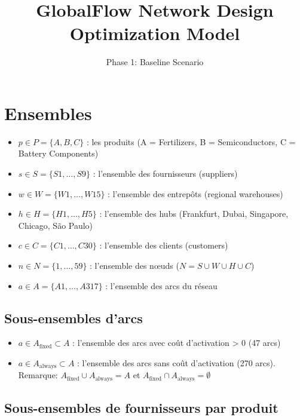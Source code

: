 \documentclass{article}
\begin{document}
\title{GlobalFlow Network Design Optimization Model}
\author{Phase 1: Baseline Scenario}
\date{}
\maketitle

\section{Ensembles}

\begin{itemize}
    \item $p \in P = \{A, B, C\}$ : les produits (A = Fertilizers, B = Semiconductors, C = Battery Components)
    \item $s \in S = \{S1, \dots, S9\}$ : l'ensemble des fournisseurs (suppliers)
    \item $w \in W = \{W1, \dots, W15\}$ : l'ensemble des entrepôts (regional warehouses)
    \item $h \in H = \{H1, \dots, H5\}$ : l'ensemble des hubs (Frankfurt, Dubai, Singapore, Chicago, São Paulo)
    \item $c \in C = \{C1, \dots, C30\}$ : l'ensemble des clients (customers)
    \item $n \in N = \{1, \dots, 59\}$ : l'ensemble des nœuds ($N = S \cup W \cup H \cup C$)
    \item $a \in A = \{A1, \dots, A317\}$ : l'ensemble des arcs du réseau
\end{itemize}

\subsection{Sous-ensembles d'arcs}

\begin{itemize}
    \item $a \in A_{\text{fixed}} \subset A$ : l'ensemble des arcs avec coût d'activation > 0 (47 arcs)
    \item $a \in A_{\text{always}} \subset A$ : l'ensemble des arcs sans coût d'activation (270 arcs).
    \quad Remarque: $A_{\text{fixed}} \cup A_{\text{always}} = A$ et $A_{\text{fixed}} \cap A_{\text{always}} = \emptyset$
\end{itemize}

\subsection{Sous-ensembles de fournisseurs par produit}
\end{document}
